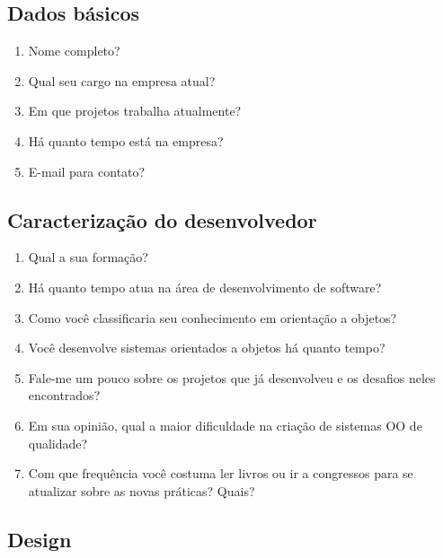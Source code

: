 \subsection{Dados básicos}
\label{entrevista:dados-basicos}

\begin{enumerate}
	\item Nome completo?

	\item Qual seu cargo na empresa atual?
	
	\item Em que projetos trabalha atualmente?
	
	\item Há quanto tempo está na empresa?

	\item E-mail para contato?

\end{enumerate}

\subsection{Caracterização do desenvolvedor}
\label{entrevista:caracterizacao}

\begin{enumerate}
	\item Qual a sua formação?

	\item Há quanto tempo atua na área de desenvolvimento de software?

	\item Como você classificaria seu conhecimento em orientação a objetos?

	\item Você desenvolve sistemas orientados a objetos há quanto tempo?	

	\item Fale-me um pouco sobre os projetos que já desenvolveu e os desafios 
	neles encontrados?

	\item Em sua opinião, qual a maior dificuldade na criação de sistemas OO de
	qualidade?

	\item Com que frequência você costuma ler livros ou ir a congressos para se 
	atualizar sobre as novas práticas? Quais?

\end{enumerate}

\subsection{Design}

